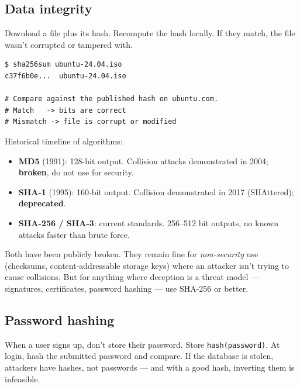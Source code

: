 \documentclass[11pt]{article}
\begin{document}
\subsection*{Data integrity}

Download a file plus its hash. Recompute the hash locally. If
they match, the file wasn't corrupted or tampered with.

\begin{examplebox}
\begin{lstlisting}[basicstyle=\ttfamily\small,frame=single]
$ sha256sum ubuntu-24.04.iso
c37f6b0e...  ubuntu-24.04.iso

# Compare against the published hash on ubuntu.com.
# Match   -> bits are correct
# Mismatch -> file is corrupt or modified
\end{lstlisting}
\end{examplebox}

Historical timeline of algorithms:
\begin{itemize}[leftmargin=*]
    \item \textbf{MD5} (1991): 128-bit output. Collision attacks
          demonstrated in 2004; \textbf{broken}, do not use for
          security.
    \item \textbf{SHA-1} (1995): 160-bit output. Collision
          demonstrated in 2017 (SHAttered); \textbf{deprecated}.
    \item \textbf{SHA-256 / SHA-3}: current standards.
          256--512 bit outputs, no known attacks faster than
          brute force.
\end{itemize}

\begin{warnbox}
Both have been publicly broken. They remain fine for
\emph{non-security} use (checksums, content-addressable storage
keys) where an attacker isn't trying to cause collisions. But
for anything where deception is a threat model --- signatures,
certificates, password hashing --- use SHA-256 or better.
\end{warnbox}

\subsection*{Password hashing}

When a user signs up, don't store their password. Store
\texttt{hash(password)}. At login, hash the submitted password
and compare. If the database is stolen, attackers have hashes,
not passwords --- and with a good hash, inverting them is
infeasible.
\end{document}
